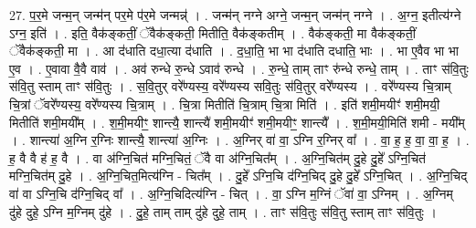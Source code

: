 \documentclass[17pt]{extarticle}
\begin{document}
27. प॒र॒मे जन्म॒न् जन्म॑न् पर॒मे प॑र॒मे जन्मन्न्॑ । . जन्म॑न् नग्ने अग्ने॒ जन्म॒न् जन्म॑न् नग्ने । . अ॒ग्न॒ इतीत्य॑ग्ने ऽग्न॒ इति॑ । . इति॒ वैक॑ङ्कतीं॒ ॅवैक॑ङ्कती॒ मितीति॒ वैक॑ङ्कतीम् । . वैक॑ङ्कती॒ मा वैक॑ङ्कतीं॒ ॅवैक॑ङ्कती॒ मा । . आ द॑धाति दधा॒त्या द॑धाति । . द॒धा॒ति॒ भा भा द॑धाति दधाति॒ भाः । . भा ए॒वैव भा भा ए॒व । . ए॒वावा वै॒वै वाव॑ । . अव॑ रुन्धे रु॒न्धे ऽवाव॑ रुन्धे । . रु॒न्धे॒ ताम् ताꣳ रु॑न्धे रुन्धे॒ ताम् । . ताꣳ स॑वि॒तुः स॑वि॒तु स्ताम् ताꣳ स॑वि॒तुः । . स॒वि॒तुर् वरे᳚ण्यस्य॒ वरे᳚ण्यस्य सवि॒तुः स॑वि॒तुर् वरे᳚ण्यस्य । . वरे᳚ण्यस्य चि॒त्राम् चि॒त्रां ॅवरे᳚ण्यस्य॒ वरे᳚ण्यस्य चि॒त्राम् । . चि॒त्रा मितीति॑ चि॒त्राम् चि॒त्रा मिति॑ । . इति॑ शमी॒मयीꣳ॑ शमी॒मयी॒ मितीति॑ शमी॒मयी᳚म् । . श॒मी॒मयीꣳ॒॒ शान्त्यै॒ शान्त्यै॑ शमी॒मयीꣳ॑ शमी॒मयीꣳ॒॒ शान्त्यै᳚ । . श॒मी॒मयी॒मिति॑ शमी - मयी᳚म् । . शान्त्या॑ अ॒ग्नि र॒ग्निः शान्त्यै॒ शान्त्या॑ अ॒ग्निः । . अ॒ग्निर् वा॑ वा॒ ऽग्नि र॒ग्निर् वा᳚ । . वा॒ ह॒ ह॒ वा॒ वा॒ ह॒ । . ह॒ वै वै ह॑ ह॒ वै । . वा अ॑ग्नि॒चित॑ मग्नि॒चितं॒ ॅवै वा अ॑ग्नि॒चित᳚म् । . अ॒ग्नि॒चित॑म् दु॒हे दु॒हे᳚ ऽग्नि॒चित॑ मग्नि॒चित॑म् दु॒हे । . अ॒ग्नि॒चित॒मित्य॑ग्नि - चित᳚म् । . दु॒हे᳚ ऽग्नि॒चि द॑ग्नि॒चिद् दु॒हे दु॒हे᳚ ऽग्नि॒चित् । . अ॒ग्नि॒चिद् वा॑ वा ऽग्नि॒चि द॑ग्नि॒चिद् वा᳚ । . अ॒ग्नि॒चिदित्य॑ग्नि - चित् । . वा॒ ऽग्नि म॒ग्निं ॅवा॑ वा॒ ऽग्निम् । . अ॒ग्निम् दु॑हे दुहे॒ ऽग्नि म॒ग्निम् दु॑हे । . दु॒हे॒ ताम् ताम् दु॑हे दुहे॒ ताम् । . ताꣳ स॑वि॒तुः स॑वि॒तु स्ताम् ताꣳ स॑वि॒तुः । \newline
\end{document}
